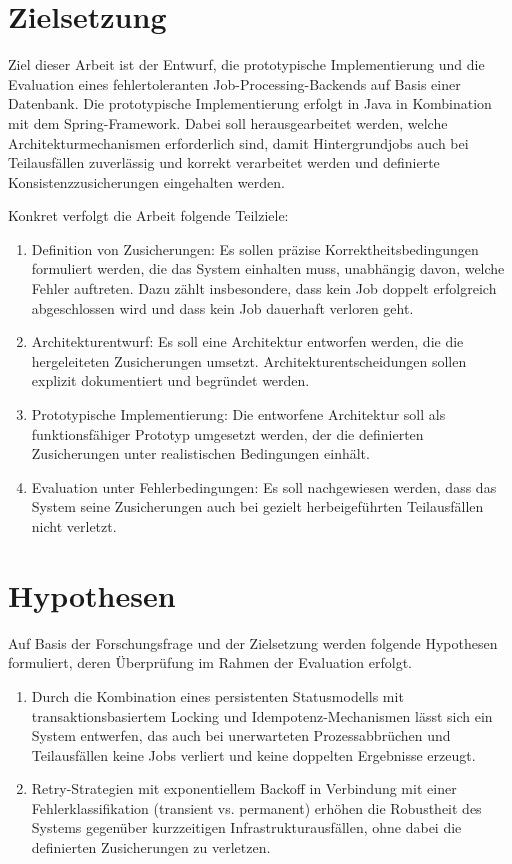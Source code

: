 \section{Zielsetzung}
\label{sec:zielsetzung}
Ziel dieser Arbeit ist der Entwurf, die prototypische Implementierung und die Evaluation
eines fehlertoleranten Job-Processing-Backends auf Basis einer Datenbank.
Die prototypische Implementierung erfolgt in Java in Kombination mit dem Spring-Framework.
Dabei soll herausgearbeitet werden, welche Architekturmechanismen erforderlich sind, damit Hintergrundjobs auch bei Teilausfällen
zuverlässig und korrekt verarbeitet werden und definierte Konsistenzzusicherungen eingehalten werden.

Konkret verfolgt die Arbeit folgende Teilziele:
\begin{enumerate}[label=TZ-\arabic*:, ref=TZ-\arabic*]
    \item \label{item:tz1} Definition von Zusicherungen: Es sollen präzise Korrektheitsbedingungen
    formuliert werden, die das System einhalten muss, unabhängig davon, welche Fehler auftreten.
    Dazu zählt insbesondere, dass kein Job doppelt erfolgreich abgeschlossen wird und dass kein Job dauerhaft verloren geht.
    \item \label{item:tz2} Architekturentwurf: Es soll eine Architektur entworfen werden, die die hergeleiteten Zusicherungen umsetzt.
    Architekturentscheidungen sollen explizit dokumentiert und begründet werden.
    \item \label{item:tz3} Prototypische Implementierung: Die entworfene Architektur soll als
    funktionsfähiger Prototyp umgesetzt werden, der die definierten Zusicherungen unter realistischen Bedingungen einhält.
    \item \label{item:tz4} Evaluation unter Fehlerbedingungen: Es soll nachgewiesen werden, dass das
    System seine Zusicherungen auch bei gezielt herbeigeführten Teilausfällen nicht
    verletzt.
\end{enumerate}

\section{Hypothesen}
\label{sec:hypothesen}
Auf Basis der Forschungsfrage und der Zielsetzung werden folgende Hypothesen formuliert,
deren Überprüfung im Rahmen der Evaluation erfolgt.
\begin{enumerate}[label=H-\arabic*:, ref=H-\arabic*]
    \item \label{item:h1} Durch die Kombination eines persistenten Statusmodells mit transaktionsbasiertem
    Locking und Idempotenz-Mechanismen lässt sich ein System entwerfen, das auch bei
    unerwarteten Prozessabbrüchen und Teilausfällen keine Jobs verliert und keine doppelten Ergebnisse
    erzeugt.
    \item \label{item:h2} Retry-Strategien mit exponentiellem Backoff in Verbindung mit einer
    Fehlerklassifikation (transient vs. permanent) erhöhen die Robustheit des Systems
    gegenüber kurzzeitigen Infrastrukturausfällen, ohne dabei die definierten Zusicherungen
    zu verletzen.
\end{enumerate}

